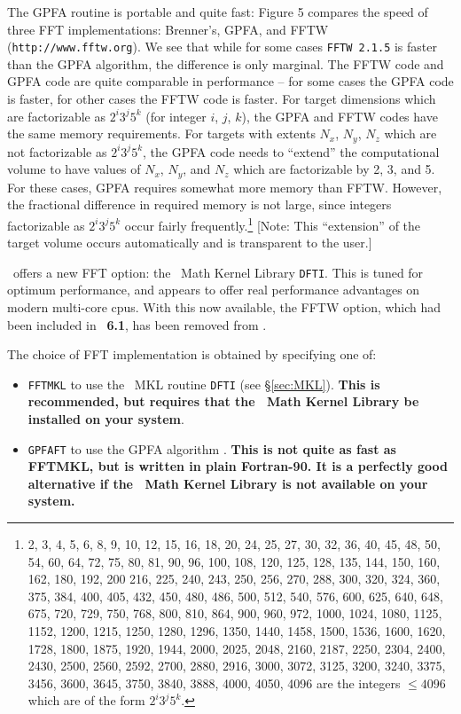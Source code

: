The GPFA routine is portable and quite fast:
Figure 5 compares the speed of three FFT implementations: Brenner's, GPFA,
and FFTW ({\tt http://www.fftw.org}).  
We see that while for some cases {\tt FFTW 2.1.5} is
faster than the GPFA algorithm, the difference is only marginal.
The FFTW code and GPFA code are quite comparable in
performance -- for some cases the GPFA code is faster, for other cases
the FFTW code is faster.
For target dimensions which are factorizable as $2^i3^j5^k$ (for integer
$i$, $j$, $k$), the GPFA
and FFTW 
codes have the same memory requirements.
For targets with extents $N_x$, $N_y$, $N_z$ 
which are not factorizable as $2^i3^j5^k$, the GPFA code
needs to ``extend'' the computational volume to have values of $N_x$,
$N_y$, and $N_z$ which are factorizable by 2, 3, and 5.
For these cases, GPFA requires somewhat more memory than
FFTW.
However, the fractional difference in required memory 
is not large, since integers factorizable
as $2^i3^j5^k$ occur fairly 
frequently.\footnote{\label{fn:235}2, 3, 4, 5, 6, 8, 9, 10, 12,
	15, 16, 18, 20, 24, 25, 27, 30, 32, 36, 40,
	45, 48, 50, 54, 60, 64, 72, 75, 80, 81, 90, 
	96, 100, 108, 120, 125, 128, 135,
	144, 150, 160, 162, 180, 192, 200  216, 225,
        240, 243, 250, 256, 270, 288, 300, 320, 324, 360, 375, 384, 400, 405,
        432, 450, 480, 486, 500, 512, 540, 576, 600, 625, 640, 648, 675, 720,
        729, 750, 768, 800, 810, 864, 900, 960, 972, 1000, 1024, 1080, 1125,
        1152, 1200, 1215, 1250, 1280, 1296, 1350, 1440, 1458, 1500, 1536,
        1600, 1620, 1728, 1800, 1875, 1920, 1944, 2000, 2025, 2048, 2160,
        2187, 2250, 2304, 2400, 2430, 2500, 2560, 2592, 2700, 2880, 2916,
        3000, 3072, 3125, 3200, 3240, 3375, 3456, 3600, 3645, 3750, 3840,
        3888, 4000, 4050, 4096 are the integers $\leq 4096$
	which are of the form $2^i3^j5^k$.}
[Note: This ``extension'' of the target volume occurs automatically and
is transparent to the user.]

\ddscatv\ offers a new FFT option: the \Intel\ Math Kernel
Library {\tt DFTI}.  This is tuned for optimum performance,
and appears to offer real performance advantages on modern multi-core cpus.
With this now available, the FFTW option, which had been included in
\ddscat\ {\bf 6.1}, has been removed from
\ddscatv. 

The choice of FFT implementation is obtained by specifying one of:
\begin{itemize}
\item{\tt FFTMKL} to use the \Intel\ MKL routine {\tt DFTI} 
        (see \S\ref{sec:MKL}).
	{\bf This is recommended, but requires that the \Intel\ Math Kernel
	Library be
	installed on your system}.
\item{\tt GPFAFT} to use the GPFA algorithm \citep{Temperton_1992}.
        {\bf This
	is not quite as fast as FFTMKL, but is written in plain Fortran-90.
        It is a perfectly good alternative if the \Intel\ Math Kernel
        Library is not available on your system.}
\end{itemize}

